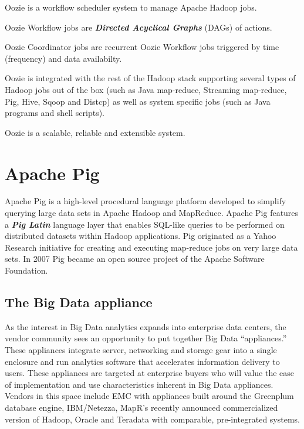 \documentclass[11pt]{article} %
\begin{document}
Oozie is a workflow scheduler system to manage Apache Hadoop jobs.

Oozie Workflow jobs are \textbf{\textit{Directed Acyclical Graphs}} (DAGs) of actions.

Oozie Coordinator jobs are recurrent Oozie Workflow jobs triggered by time (frequency) and data availabilty.

Oozie is integrated with the rest of the Hadoop stack supporting several types of Hadoop jobs out of the box (such as Java map-reduce, Streaming map-reduce, Pig, Hive, Sqoop and Distcp) as well as system specific jobs (such as Java programs and shell scripts).

Oozie is a scalable, reliable and extensible system.


\newpage
\section{Apache Pig}

Apache Pig is a high-level procedural language platform developed to simplify querying large data sets in Apache Hadoop and MapReduce. Apache Pig features a \textbf{\textit{Pig Latin}} language layer that enables SQL-like queries to be performed on distributed datasets within Hadoop applications.
Pig originated as a Yahoo Research initiative for creating and executing map-reduce jobs on very large data sets.  In 2007 Pig became an open source project of the Apache Software Foundation.

\newpage


\subsection{The Big Data appliance}


As the interest in Big Data analytics expands into enterprise data centers, the vendor community sees an opportunity to put together Big Data “appliances.” These appliances integrate server, networking and storage gear into a single enclosure and run analytics software that accelerates information delivery to users. These appliances are targeted at enterprise buyers who will value the ease of implementation and use characteristics inherent in Big Data appliances. Vendors in this space include EMC with appliances built around the Greenplum database engine, IBM/Netezza, MapR’s recently announced commercialized version of Hadoop, Oracle and Teradata with comparable, pre-integrated systems.
\end{document}
